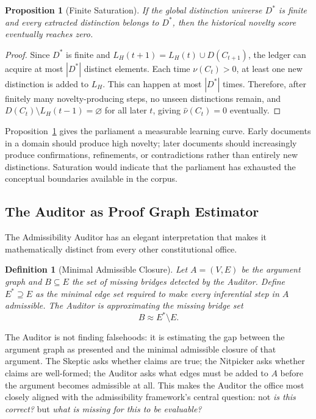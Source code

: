 \documentclass[12pt, a4paper]{article}
\newtheorem{definition}{Definition}[section]
\newtheorem{proposition}{Proposition}[section]
\theoremstyle{principle}
\theoremstyle{definition}
\begin{document}
\begin{proposition}[Finite Saturation]
\label{prop:saturation}
If the global distinction universe $D^*$ is finite and every extracted distinction
belongs to $D^*$, then the historical novelty score eventually reaches zero.
\end{proposition}

\begin{proof}
Since $D^*$ is finite and $L_H(t+1) = L_H(t) \cup D(C_{t+1})$, the ledger can
acquire at most $|D^*|$ distinct elements. Each time $\nu(C_t) > 0$, at least one
new distinction is added to $L_H$. This can happen at most $|D^*|$ times. Therefore,
after finitely many novelty-producing steps, no unseen distinctions remain, and
$D(C_t) \setminus L_H(t-1) = \varnothing$ for all later $t$, giving
$\hat{\nu}(C_t) = 0$ eventually.
\end{proof}

Proposition~\ref{prop:saturation} gives the parliament a measurable learning curve.
Early documents in a domain should produce high novelty; later documents should
increasingly produce confirmations, refinements, or contradictions rather than
entirely new distinctions. Saturation would indicate that the parliament has
exhausted the conceptual boundaries available in the corpus.

\subsection{The Auditor as Proof Graph Estimator}

The Admissibility Auditor has an elegant interpretation that makes it mathematically
distinct from every other constitutional office.

\begin{definition}[Minimal Admissible Closure]
Let $A = (V, E)$ be the argument graph and $B \subseteq E$ the set of missing
bridges detected by the Auditor. Define $E^* \supseteq E$ as the minimal edge set
required to make every inferential step in $A$ admissible. The Auditor is
approximating the \emph{missing bridge set}
\[
B \approx E^* \setminus E.
\]
\end{definition}

The Auditor is not finding falsehoods: it is estimating the gap between the argument
graph as presented and the minimal admissible closure of that argument. The Skeptic
asks whether claims are true; the Nitpicker asks whether claims are well-formed; the
Auditor asks what edges must be added to $A$ before the argument becomes
admissible at all. This makes the Auditor the office most closely aligned with the
admissibility framework's central question: not \emph{is this correct?} but
\emph{what is missing for this to be evaluable?}
\end{document}
